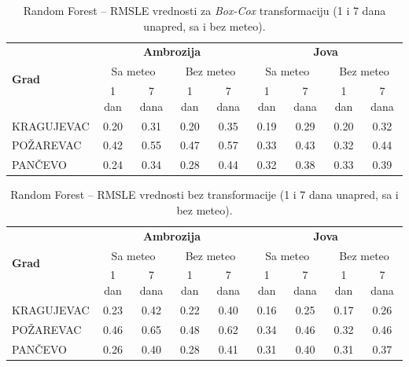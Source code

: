 \documentclass[12pt]{article}
\begin{document}
\begin{table}[h!]
\centering
\caption{Random Forest – RMSLE vrednosti za \textit{Box-Cox} transformaciju (1 i 7 dana unapred, sa i bez meteo).}
\label{tab:rf_rmsle_boxcox}
\begin{tabular}{|l|c|c|c|c||c|c|c|c|}
\hline
\multirow{3}{*}{\textbf{Grad}} 
& \multicolumn{4}{c||}{\textbf{Ambrozija}} 
& \multicolumn{4}{c|}{\textbf{Jova}} \\ \cline{2-9}
& \multicolumn{2}{c|}{Sa meteo} & \multicolumn{2}{c||}{Bez meteo} 
& \multicolumn{2}{c|}{Sa meteo} & \multicolumn{2}{c|}{Bez meteo} \\ \cline{2-9}
& 1 dan & 7 dana & 1 dan & 7 dana & 1 dan & 7 dana & 1 dan & 7 dana \\ \hline
KRAGUJEVAC & 0.20 & 0.31 & 0.20 & 0.35 & 0.19 & 0.29 & 0.20 & 0.32 \\ \hline
POŽAREVAC  & 0.42 & 0.55 & 0.47 & 0.57 & 0.33 & 0.43 & 0.32 & 0.44 \\ \hline
PANČEVO    & 0.24 & 0.34 & 0.28 & 0.44 & 0.32 & 0.38 & 0.33 & 0.39 \\ \hline
\end{tabular}
\end{table}

\begin{table}[h!]
\centering
\caption{Random Forest – RMSLE vrednosti bez transformacije (1 i 7 dana unapred, sa i bez meteo).}
\label{tab:rf_rmsle_none}
\begin{tabular}{|l|c|c|c|c||c|c|c|c|}
\hline
\multirow{3}{*}{\textbf{Grad}} 
& \multicolumn{4}{c||}{\textbf{Ambrozija}} 
& \multicolumn{4}{c|}{\textbf{Jova}} \\ \cline{2-9}
& \multicolumn{2}{c|}{Sa meteo} & \multicolumn{2}{c||}{Bez meteo} 
& \multicolumn{2}{c|}{Sa meteo} & \multicolumn{2}{c|}{Bez meteo} \\ \cline{2-9}
& 1 dan & 7 dana & 1 dan & 7 dana & 1 dan & 7 dana & 1 dan & 7 dana \\ \hline
KRAGUJEVAC & 0.23 & 0.42 & 0.22 & 0.40 & 0.16 & 0.25 & 0.17 & 0.26 \\ \hline
POŽAREVAC  & 0.46 & 0.65 & 0.48 & 0.62 & 0.34 & 0.46 & 0.32 & 0.46 \\ \hline
PANČEVO    & 0.26 & 0.40 & 0.28 & 0.41 & 0.31 & 0.40 & 0.31 & 0.37 \\ \hline
\end{tabular}
\end{table}
\end{document}
